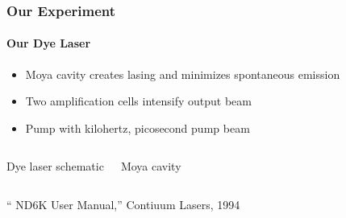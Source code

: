 \documentclass{beamer}
\begin{document}
\begin{frame}
  \frametitle{Our Experiment}
  \framesubtitle{Our Dye Laser}
  \begin{itemize}
	\item Moya cavity creates lasing and minimizes spontaneous emission
	\item Two amplification cells intensify output beam
	\item Pump with kilohertz, picosecond pump beam
  \end{itemize}
  \begin{columns}
\center	Dye laser schematic
  \center Moya cavity
  \end{columns}
 {\tiny `` ND6K User Manual,'' Contiuum Lasers, 1994}
\end{frame}
\end{document}
